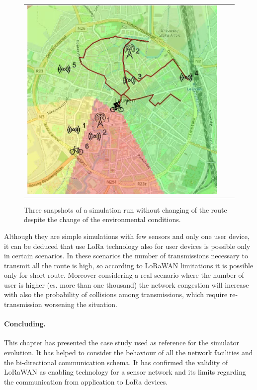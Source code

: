 \begin{figure}[h]
\begin{tabular}{lll}
         \includegraphics[scale=0.42]{figures/sim2snap3.png} 
    \end{tabular}
    \caption[Three snapshots of a simulation run without changing of the route]{Three snapshots of a simulation run without changing of the route despite the change of the environmental conditions.}
    \label{fig:sim2}
\end{figure}
% 

Although they are simple simulations with few sensors and only one user device, it can be deduced that use LoRa technology also for user devices is possible only in certain scenarios.
In these scenarios the number of transmissions necessary to transmit all the route is high, so according to LoRaWAN limitations it is possible only for short route.
Moreover considering a real scenario where the number of user is higher (es. more than one thousand) the network congestion will increase with also the probability of collisions among transmissions, which require re-transmission worsening the situation.

\paragraph{Concluding.} This chapter has presented the case study used as reference for the simulator evolution.
It has helped to consider the behaviour of all the network facilities and the bi-directional communication schema.
It has confirmed the validity of LoRaWAN as enabling technology for a sensor network and its limits regarding the communication from application to LoRa devices.